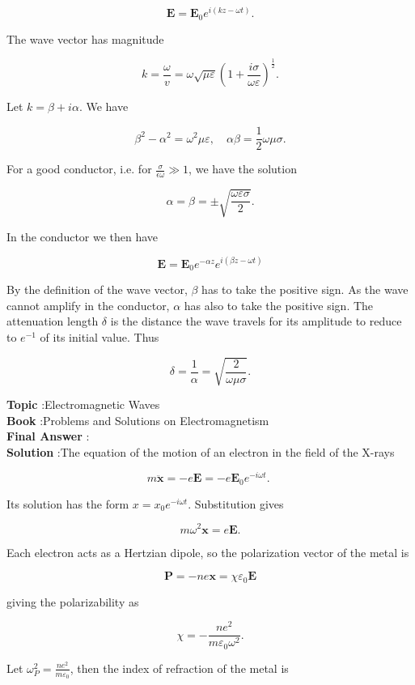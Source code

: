 \documentclass[10pt]{article}
\begin{document}
$$
\mathbf{E}=\mathbf{E}_{0} e^{i(k z-\omega t)} .
$$

The wave vector has magnitude

$$
k=\frac{\omega}{v}=\omega \sqrt{\mu \varepsilon}\left(1+\frac{i \sigma}{\omega \varepsilon}\right)^{\frac{1}{2}} .
$$

Let $k=\beta+i \alpha$. We have

$$
\beta^{2}-\alpha^{2}=\omega^{2} \mu \varepsilon, \quad \alpha \beta=\frac{1}{2} \omega \mu \sigma .
$$

For a good conductor, i.e. for $\frac{\sigma}{\epsilon \omega} \gg 1$, we have the solution

$$
\alpha=\beta=\pm \sqrt{\frac{\omega \varepsilon \sigma}{2}} .
$$

In the conductor we then have

$$
\mathbf{E}=\mathbf{E}_{0} e^{-\alpha z} e^{i(\beta z-\omega t)}
$$

By the definition of the wave vector, $\beta$ has to take the positive sign. As the wave cannot amplify in the conductor, $\alpha$ has also to take the positive sign. The attenuation length $\delta$ is the distance the wave travels for its amplitude to reduce to $e^{-1}$ of its initial value. Thus

$$
\delta=\frac{1}{\alpha}=\sqrt{\frac{2}{\omega \mu \sigma}} .
$$


\textbf{Topic} :Electromagnetic Waves\\
\textbf{Book} :Problems and Solutions on Electromagnetism\\
\textbf{Final Answer} :\\


\textbf{Solution} :The equation of the motion of an electron in the field of the X-rays

$$
m \ddot{\mathbf{x}}=-e \mathbf{E}=-e \mathbf{E}_{0} e^{-i \omega t} \text {. }
$$

Its solution has the form $x=x_{0} e^{-i \omega t}$. Substitution gives

$$
m \omega^{2} \mathbf{x}=e \mathbf{E} .
$$

Each electron acts as a Hertzian dipole, so the polarization vector of the metal is

$$
\mathbf{P}=-n e \mathbf{x}=\chi \varepsilon_{0} \mathbf{E}
$$

giving the polarizability as

$$
\chi=-\frac{n e^{2}}{m \varepsilon_{0} \omega^{2}} .
$$

Let $\omega_{P}^{2}=\frac{n e^{2}}{m \varepsilon_{0}}$, then the index of refraction of the metal is
\end{document}
